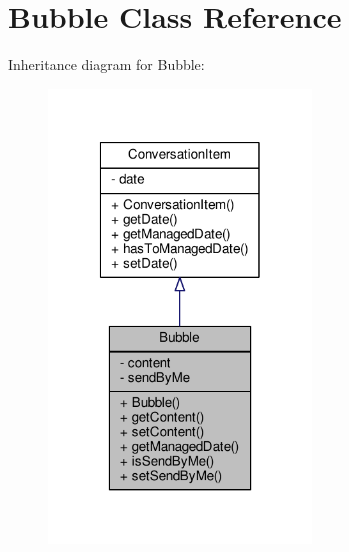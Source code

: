 \hypertarget{a00004}{\section{Bubble Class Reference}
\label{a00004}
}


Inheritance diagram for Bubble\+:
\nopagebreak
\begin{figure}[H]
\begin{center}
\leavevmode
\includegraphics[width=198pt]{a00055}
\end{center}
\end{figure}



